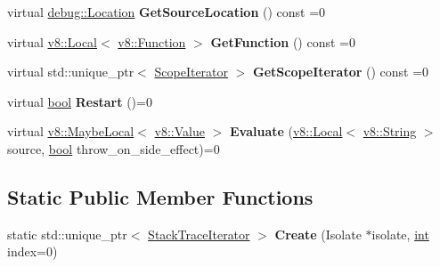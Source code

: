 \begin{DoxyCompactItemize}
\item 
\mbox{\label{classv8_1_1debug_1_1StackTraceIterator_abe02bcf2447784997d9de17711daf22d}} 
virtual \mbox{\hyperlink{classv8_1_1debug_1_1Location}{debug\+::\+Location}} {\bfseries Get\+Source\+Location} () const =0
\item 
\mbox{\label{classv8_1_1debug_1_1StackTraceIterator_a7023a687410611ca9e6a40addd0250df}} 
virtual \mbox{\hyperlink{classv8_1_1Local}{v8\+::\+Local}}$<$ \mbox{\hyperlink{classv8_1_1Function}{v8\+::\+Function}} $>$ {\bfseries Get\+Function} () const =0
\item 
\mbox{\label{classv8_1_1debug_1_1StackTraceIterator_a0a911f40505411ecad85f320da4f36ab}} 
virtual std\+::unique\+\_\+ptr$<$ \mbox{\hyperlink{classv8_1_1debug_1_1ScopeIterator}{Scope\+Iterator}} $>$ {\bfseries Get\+Scope\+Iterator} () const =0
\item 
\mbox{\label{classv8_1_1debug_1_1StackTraceIterator_a9fffe93441a57edda5611370334a4bc3}} 
virtual \mbox{\hyperlink{classbool}{bool}} {\bfseries Restart} ()=0
\item 
\mbox{\label{classv8_1_1debug_1_1StackTraceIterator_a6e4eb03910347c7770ba250bc0b34d00}} 
virtual \mbox{\hyperlink{classv8_1_1MaybeLocal}{v8\+::\+Maybe\+Local}}$<$ \mbox{\hyperlink{classv8_1_1Value}{v8\+::\+Value}} $>$ {\bfseries Evaluate} (\mbox{\hyperlink{classv8_1_1Local}{v8\+::\+Local}}$<$ \mbox{\hyperlink{classv8_1_1String}{v8\+::\+String}} $>$ source, \mbox{\hyperlink{classbool}{bool}} throw\+\_\+on\+\_\+side\+\_\+effect)=0
\end{DoxyCompactItemize}
\subsection*{Static Public Member Functions}
\begin{DoxyCompactItemize}
\item 
\mbox{\label{classv8_1_1debug_1_1StackTraceIterator_a6df2fb5c132eb909ab618a3c5ca4a46c}} 
static std\+::unique\+\_\+ptr$<$ \mbox{\hyperlink{classv8_1_1debug_1_1StackTraceIterator}{Stack\+Trace\+Iterator}} $>$ {\bfseries Create} (Isolate $\ast$isolate, \mbox{\hyperlink{classint}{int}} index=0)
\end{DoxyCompactItemize}


